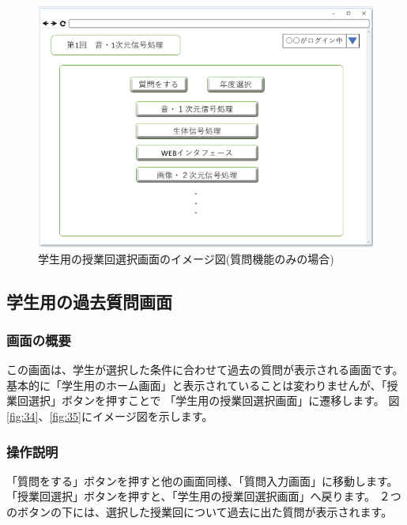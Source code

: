 \begin{figure}[phtbp]
  \begin{center}
    \includegraphics[width=0.55\linewidth,clip]{./img/33.png}
    \caption{学生用の授業回選択画面のイメージ図(質問機能のみの場合)}\label{fig:33}
  \end{center}
\end{figure}


\newpage

\subsection{学生用の過去質問画面}
\subsubsection{画面の概要}
この画面は、学生が選択した条件に合わせて過去の質問が表示される画面です。
基本的に「学生用のホーム画面」と表示されていることは変わりませんが、「授業回選択」ボタンを押すことで
「学生用の授業回選択画面」に遷移します。
図\ref{fig:34}、\ref{fig:35}にイメージ図を示します。

\subsubsection{操作説明}
「質問をする」ボタンを押すと他の画面同様、「質問入力画面」に移動します。
「授業回選択」ボタンを押すと、「学生用の授業回選択画面」へ戻ります。
２つのボタンの下には、選択した授業回について過去に出た質問が表示されます。

